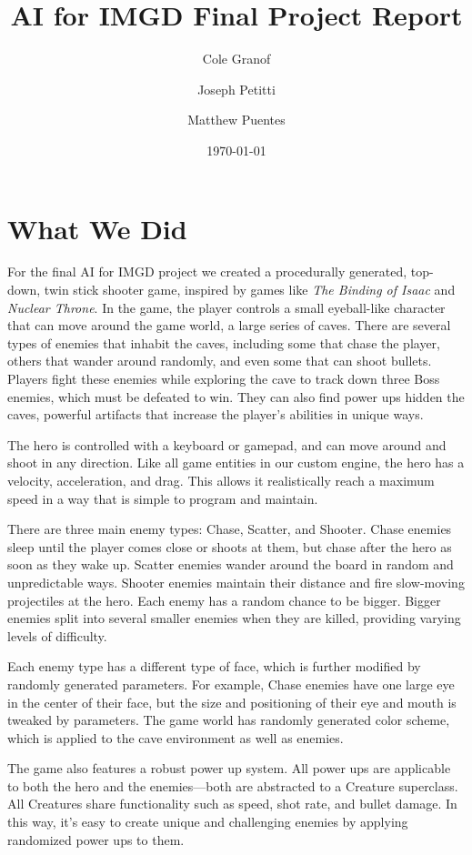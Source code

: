 \documentclass[a4paper, 12pt]{article}
\title{AI for IMGD Final Project Report}
\author{Cole Granof \and Joseph Petitti \and Matthew Puentes}
\date{\today}
\begin{document}
\maketitle

\section{What We Did}

For the final AI for IMGD project we created a procedurally generated, top-down,
twin stick shooter game, inspired by games like \textit{The Binding of Isaac}
and \textit{Nuclear Throne}. In the game, the player controls a small
eyeball-like character that can move around the game world, a large series of
caves. There are several types of enemies that inhabit the caves, including some
that chase the player, others that wander around randomly, and even some that
can shoot bullets. Players fight these enemies while exploring the cave to track
down three Boss enemies, which must be defeated to win. They can also find power
ups hidden the caves, powerful artifacts that increase the player's abilities in
unique ways.

The hero is controlled with a keyboard or gamepad, and can move around and shoot
in any direction. Like all game entities in our custom engine, the hero has a
velocity, acceleration, and drag. This allows it realistically reach a maximum
speed in a way that is simple to program and maintain.

There are three main enemy types: Chase, Scatter, and Shooter. Chase enemies
sleep until the player comes close or shoots at them, but chase after the hero
as soon as they wake up. Scatter enemies wander around the board in random and
unpredictable ways. Shooter enemies maintain their distance and fire slow-moving
projectiles at the hero. Each enemy has a random chance to be bigger. Bigger
enemies split into several smaller enemies when they are killed, providing
varying levels of difficulty.

Each enemy type has a different type of face, which is further modified by
randomly generated parameters. For example, Chase enemies have one large eye in
the center of their face, but the size and positioning of their eye and mouth is
tweaked by parameters. The game world has randomly generated color scheme, which
is applied to the cave environment as well as enemies.

The game also features a robust power up system. All power ups are applicable to
both the hero and the enemies---both are abstracted to a Creature superclass.
All Creatures share functionality such as speed, shot rate, and bullet damage.
In this way, it's easy to create unique and challenging enemies by applying
randomized power ups to them.
\end{document}
